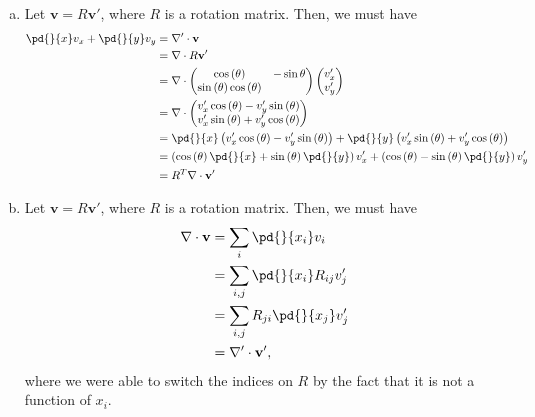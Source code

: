 \documentclass[10pt]{mypackage}
\begin{document}
\begin{solution}[29.12]\hfill
  \begin{enumerate}[(a)]
    \item Let $\mathbf{v} = R\mathbf{v}'$, where $R$ is a rotation matrix. Then, we must have
      \begin{align*}
        \pd{}{x}v_x + \pd{}{y}v_y &= \nabla'\cdot \mathbf{v}\\
                                      &= \nabla\cdot R\mathbf{v}'\\
                                 &= \nabla \cdot \begin{pmatrix}\cos\left( \theta \right) & -\sin\theta \\ \sin\left( \theta \right)\cos\left( \theta \right)\end{pmatrix} \begin{pmatrix}v_x'\\v_y'\end{pmatrix}\\
                                 &= \nabla \cdot \begin{pmatrix}v_x'\cos\left( \theta \right) - v_y'\sin\left( \theta \right) \\ v_x'\sin\left( \theta \right) + v_y'\cos\left( \theta \right)\end{pmatrix}\\
                                 &= \pd{}{x}\left( v_x'\cos\left( \theta \right) - v_y'\sin\left( \theta \right) \right) + \pd{}{y}\left( v_x'\sin\left( \theta \right) + v_y'\cos\left( \theta \right) \right)\\
                                 &= \left( \cos\left( \theta \right) \pd{}{x}+\sin\left( \theta \right)\pd{}{y} \right)v_x' + \left( \cos\left( \theta \right) - \sin\left( \theta \right)\pd{}{y} \right)v_y'\\
                                 &= R^{T}\nabla \cdot \mathbf{v}'
      \end{align*}
    \item Let $\mathbf{v} = R\mathbf{v}'$, where $R$ is a rotation matrix. Then, we must have
      \begin{align*}
        \nabla \cdot \mathbf{v} &= \sum_{i} \pd{}{x_i}v_i\\
                                &= \sum_{i,j}\pd{}{x_i}R_{ij}v_j'\\
                                &= \sum_{i,j}R_{ji}\pd{}{x_j}v_j'\\
                                &= \nabla'\cdot \mathbf{v}',
      \end{align*}
      where we were able to switch the indices on $R$ by the fact that it is not a function of $x_i$.
  \end{enumerate}
\end{solution}
\end{document}
